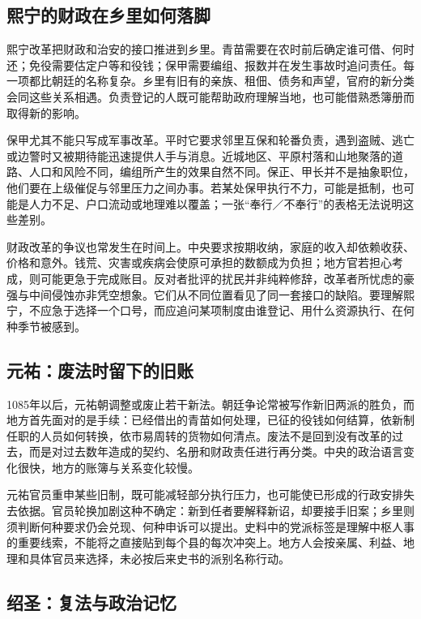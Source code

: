 \subsection{熙宁的财政在乡里如何落脚}

熙宁改革把财政和治安的接口推进到乡里。青苗需要在农时前后确定谁可借、何时还；免役需要估定户等和役钱；保甲需要编组、报数并在发生事故时追问责任。每一项都比朝廷的名称复杂。乡里有旧有的亲族、租佃、债务和声望，官府的新分类会同这些关系相遇。负责登记的人既可能帮助政府理解当地，也可能借熟悉簿册而取得新的影响。

保甲尤其不能只写成军事改革。平时它要求邻里互保和轮番负责，遇到盗贼、逃亡或边警时又被期待能迅速提供人手与消息。近城地区、平原村落和山地聚落的道路、人口和风险不同，编组所产生的效果自然不同。保正、甲长并不是抽象职位，他们要在上级催促与邻里压力之间办事。若某处保甲执行不力，可能是抵制，也可能是人力不足、户口流动或地理难以覆盖；一张“奉行／不奉行”的表格无法说明这些差别。

财政改革的争议也常发生在时间上。中央要求按期收纳，家庭的收入却依赖收获、价格和意外。钱荒、灾害或疾病会使原可承担的数额成为负担；地方官若担心考成，则可能更急于完成账目。反对者批评的扰民并非纯粹修辞，改革者所忧虑的豪强与中间侵蚀亦非凭空想象。它们从不同位置看见了同一套接口的缺陷。要理解熙宁，不应急于选择一个口号，而应追问某项制度由谁登记、用什么资源执行、在何种季节被感到。

\subsection{元祐：废法时留下的旧账}

1085年以后，元祐朝调整或废止若干新法。朝廷争论常被写作新旧两派的胜负，而地方首先面对的是手续：已经借出的青苗如何处理，已征的役钱如何结算，依新制任职的人员如何转换，依市易周转的货物如何清点。废法不是回到没有改革的过去，而是对过去数年造成的契约、名册和财政责任进行再分类。中央的政治语言变化很快，地方的账簿与关系变化较慢。

元祐官员重申某些旧制，既可能减轻部分执行压力，也可能使已形成的行政安排失去依据。官员轮换加剧这种不确定：新到任者要解释新诏，却要接手旧案；乡里则须判断何种要求仍会兑现、何种申诉可以提出。史料中的党派标签是理解中枢人事的重要线索，不能将之直接贴到每个县的每次冲突上。地方人会按亲属、利益、地理和具体官员来选择，未必按后来史书的派别名称行动。

\subsection{绍圣：复法与政治记忆}

